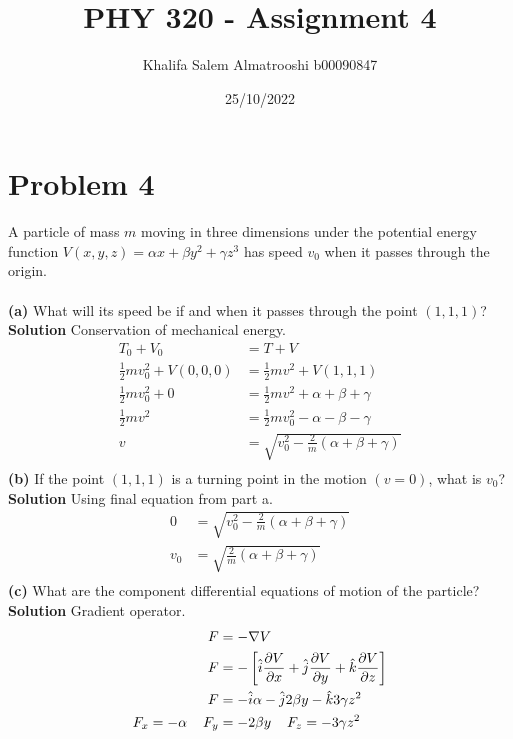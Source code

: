 \documentclass[]{article}
\title{PHY 320 - Assignment 4}
\author{Khalifa Salem Almatrooshi b00090847}
\date{25/10/2022}
\newcommand{\bd}{\textbf}
\newcommand\sep[1]{%
	\leavevmode\unskip\unskip 
	\nobreak %
	\hspace{#1}\ignorespaces
}
\begin{document}
	
	\maketitle
	
	\section{Problem 4}
	
	A particle of mass $ m $ moving in three dimensions under the potential energy function \newline $ V(x, y, z) = \alpha x + \beta y^2 + \gamma z^3 $ has speed $ v_0 $ when it passes through the origin.
	\\\\
	\bd{(a)} What will its speed be if and when it passes through the point $ (1,1,1) $? \\
	
	\bd{Solution} Conservation of mechanical energy.
	\begin{equation}
		\begin{split}
			T_0 + V_0 &= T + V \\
			\frac{1}{2} m v_0^2 + V(0,0,0) &= \frac{1}{2} m v^2 + V(1,1,1) \\
			\frac{1}{2} m v_0^2 + 0 &= \frac{1}{2} m v^2 + \alpha + \beta + \gamma \\
			\frac{1}{2} m v^2 &= \frac{1}{2} m v_0^2 - \alpha - \beta - \gamma \\
			v &= \sqrt{v_0^2 - \frac{2}{m} ( \alpha + \beta + \gamma )} \\
		\end{split}
	\end{equation}
	\bd{(b)} If the point $ (1,1,1) $ is a turning point in the motion $ (v=0) $, what is $ v_0 $? \\

	\bd{Solution} Using final equation from part a.
	\begin{equation}
		\begin{split}
			0 &= \sqrt{v_0^2 - \frac{2}{m} ( \alpha + \beta + \gamma )} \\
			v_0 &= \sqrt{\frac{2}{m} ( \alpha + \beta + \gamma )} \\
		\end{split}
	\end{equation}
	\bd{(c)} What are the component differential equations of motion of the particle? \\
	
	\bd{Solution} Gradient operator.
	\begin{equation}
		\begin{split}
			F &= -\nabla V \\
			F &= -\left[ \hat{i} \frac{\partial V}{\partial x} + \hat{j} \frac{\partial V}{\partial y} + \hat{k} \frac{\partial V}{\partial z} \right] \\
			F &= -\hat{i} \alpha - \hat{j} 2\beta y - \hat{k} 3\gamma z^2 \\
			F_x = -\alpha \sep{4mm} F_y &= -2\beta y \sep{4mm} F_z = -3\gamma z^2 \\
		\end{split}
	\end{equation}
\end{document}

